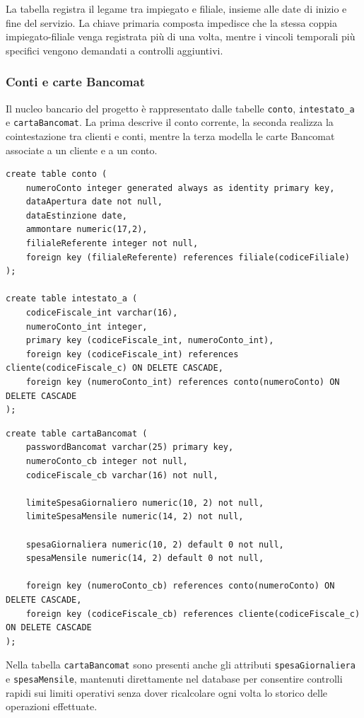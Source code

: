 La tabella registra il legame tra impiegato e filiale, insieme alle date di inizio e fine del servizio. La chiave primaria composta impedisce che la stessa coppia impiegato-filiale venga registrata più di una volta, mentre i vincoli temporali più specifici vengono demandati a controlli aggiuntivi.

\subsubsection{Conti e carte Bancomat}
Il nucleo bancario del progetto è rappresentato dalle tabelle \texttt{conto}, \texttt{intestato\_a} e \texttt{cartaBancomat}. La prima descrive il conto corrente, la seconda realizza la cointestazione tra clienti e conti, mentre la terza modella le carte Bancomat associate a un cliente e a un conto.

\begin{lstlisting}[caption={Tabelle conto e intestato\_a}]
create table conto (
    numeroConto integer generated always as identity primary key,
    dataApertura date not null,
    dataEstinzione date,
    ammontare numeric(17,2),
    filialeReferente integer not null,
    foreign key (filialeReferente) references filiale(codiceFiliale)
);

create table intestato_a (
    codiceFiscale_int varchar(16),
    numeroConto_int integer,
    primary key (codiceFiscale_int, numeroConto_int),
    foreign key (codiceFiscale_int) references cliente(codiceFiscale_c) ON DELETE CASCADE,
    foreign key (numeroConto_int) references conto(numeroConto) ON DELETE CASCADE
);
\end{lstlisting}

\begin{lstlisting}[caption={Tabella cartaBancomat}]
create table cartaBancomat (
    passwordBancomat varchar(25) primary key,
    numeroConto_cb integer not null,
    codiceFiscale_cb varchar(16) not null,

    limiteSpesaGiornaliero numeric(10, 2) not null,
    limiteSpesaMensile numeric(14, 2) not null,

    spesaGiornaliera numeric(10, 2) default 0 not null,
    spesaMensile numeric(14, 2) default 0 not null,

    foreign key (numeroConto_cb) references conto(numeroConto) ON DELETE CASCADE,
    foreign key (codiceFiscale_cb) references cliente(codiceFiscale_c) ON DELETE CASCADE
);
\end{lstlisting}

Nella tabella \texttt{cartaBancomat} sono presenti anche gli attributi \texttt{spesaGiornaliera} e \texttt{spesaMensile}, mantenuti direttamente nel database per consentire controlli rapidi sui limiti operativi senza dover ricalcolare ogni volta lo storico delle operazioni effettuate.

